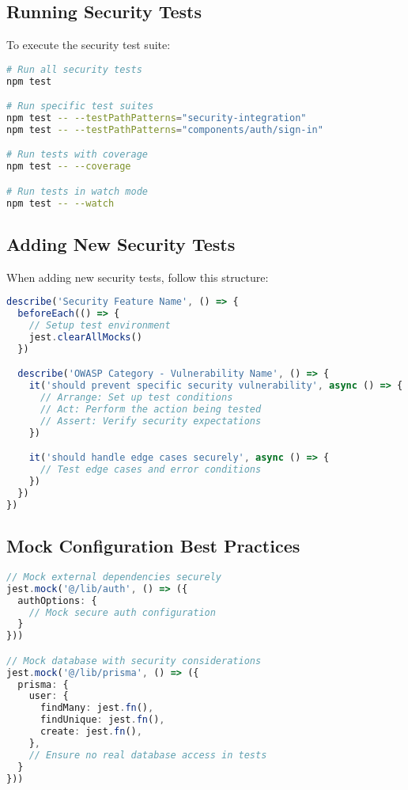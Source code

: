 \documentclass[12pt]{article}
\begin{document}
\subsection{Running Security Tests}

To execute the security test suite:

\begin{lstlisting}[language=bash, caption=Test Execution Commands]
# Run all security tests
npm test

# Run specific test suites
npm test -- --testPathPatterns="security-integration"
npm test -- --testPathPatterns="components/auth/sign-in"

# Run tests with coverage
npm test -- --coverage

# Run tests in watch mode
npm test -- --watch
\end{lstlisting}

\subsection{Adding New Security Tests}

When adding new security tests, follow this structure:

\begin{lstlisting}[language=typescript, caption=Security Test Template]
describe('Security Feature Name', () => {
  beforeEach(() => {
    // Setup test environment
    jest.clearAllMocks()
  })

  describe('OWASP Category - Vulnerability Name', () => {
    it('should prevent specific security vulnerability', async () => {
      // Arrange: Set up test conditions
      // Act: Perform the action being tested
      // Assert: Verify security expectations
    })

    it('should handle edge cases securely', async () => {
      // Test edge cases and error conditions
    })
  })
})
\end{lstlisting}

\subsection{Mock Configuration Best Practices}

\begin{lstlisting}[language=typescript, caption=Security Mock Setup]
// Mock external dependencies securely
jest.mock('@/lib/auth', () => ({
  authOptions: {
    // Mock secure auth configuration
  }
}))

// Mock database with security considerations
jest.mock('@/lib/prisma', () => ({
  prisma: {
    user: {
      findMany: jest.fn(),
      findUnique: jest.fn(),
      create: jest.fn(),
    },
    // Ensure no real database access in tests
  }
}))
\end{lstlisting}
\end{document}
